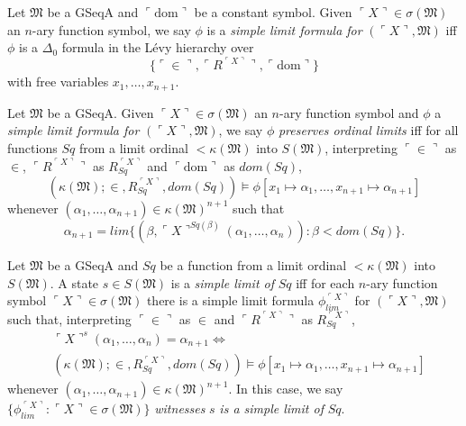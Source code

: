\documentclass[12pt]{article}
\numberwithin{equation}{section}
\begin{document}
\begin{defi}
Let $\mathfrak{M}$ be a GSeqA and $\ulcorner \mathrm{dom} \urcorner$ be a constant symbol. Given $\ulcorner X \urcorner \in \sigma(\mathfrak{M})$ an $n$-ary function symbol, we say $\phi$ is a \emph{simple limit formula for} $(\ulcorner X \urcorner, \mathfrak{M})$ iff $\phi$ is a $\Delta_0$ formula in the L\'{e}vy hierarchy over $$\{\ulcorner \in \urcorner, \ulcorner R^{\ulcorner X \urcorner} \urcorner, \ulcorner \mathrm{dom} \urcorner\}$$ with free variables $x_1, \dots, x_{n+1}$.
\end{defi}

\begin{defi}\label{def234c}
Let $\mathfrak{M}$ be a GSeqA. Given $\ulcorner X \urcorner \in \sigma(\mathfrak{M})$ an $n$-ary function symbol and $\phi$ a \emph{simple limit formula for} $(\ulcorner X \urcorner, \mathfrak{M})$, we say $\phi$ \emph{preserves ordinal limits} iff for all functions $Sq$ from a limit ordinal $< \kappa(\mathfrak{M})$ into $S(\mathfrak{M})$, interpreting $\ulcorner \in \urcorner$ as $\in$, $\ulcorner R^{\ulcorner X \urcorner} \urcorner$ as $R_{Sq}^{\ulcorner X \urcorner}$ and $\ulcorner \mathrm{dom} \urcorner$ as $dom(Sq)$, 
\begin{equation*}
    (\kappa(\mathfrak{M}); \in, R_{Sq}^{\ulcorner X \urcorner}, dom(Sq)) \models \phi[x_1 \mapsto \alpha_1, \dots, x_{n+1} \mapsto \alpha_{n+1}]
\end{equation*}
whenever $(\alpha_1, \dots, \alpha_{n+1}) \in \kappa(\mathfrak{M})^{n+1}$ such that 
\begin{equation*}
    \alpha_{n+1} = lim \{(\beta, \ulcorner X \urcorner^{Sq(\beta)}(\alpha_1, \dots, \alpha_n)) : \beta < dom(Sq)\} \text{.}
\end{equation*}
\end{defi}

\begin{defi}\label{def234}
Let $\mathfrak{M}$ be a GSeqA and $Sq$ be a function from a limit ordinal $< \kappa(\mathfrak{M})$ into $S(\mathfrak{M})$. A state $s \in S(\mathfrak{M})$ is a \emph{simple limit of} $Sq$ iff for each $n$-ary function symbol $\ulcorner X \urcorner \in \sigma(\mathfrak{M})$ there is a simple limit formula $\phi_{lim}^{\ulcorner X \urcorner}$ for $(\ulcorner X \urcorner, \mathfrak{M})$ such that, interpreting $\ulcorner \in \urcorner$ as $\in$ and $\ulcorner R^{\ulcorner X \urcorner} \urcorner$ as $R_{Sq}^{\ulcorner X \urcorner}$, 
\begin{align*}
    & \ulcorner X \urcorner^s (\alpha_1, \dots, \alpha_n) = \alpha_{n+1} \iff \\
    & (\kappa(\mathfrak{M}); \in, R_{Sq}^{\ulcorner X \urcorner}, dom(Sq)) \models \phi[x_1 \mapsto \alpha_1, \dots, x_{n+1} \mapsto \alpha_{n+1}]
\end{align*}
whenever $(\alpha_1, \dots, \alpha_{n+1}) \in \kappa(\mathfrak{M})^{n+1}$. In this case, we say $\{\phi_{lim}^{\ulcorner X \urcorner} : \ulcorner X \urcorner \in \sigma(\mathfrak{M})\}$ \emph{witnesses} $s$ \emph{is a simple limit of} $Sq$.
\end{defi}
\end{document}

